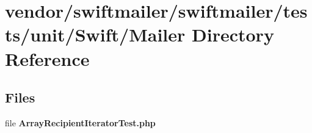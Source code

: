 \section{vendor/swiftmailer/swiftmailer/tests/unit/\+Swift/\+Mailer Directory Reference}
\label{dir_ae8645bb688610f2f2b44ec08e87930e}
\subsection*{Files}
\begin{DoxyCompactItemize}
\item 
file {\bf Array\+Recipient\+Iterator\+Test.\+php}
\end{DoxyCompactItemize}
